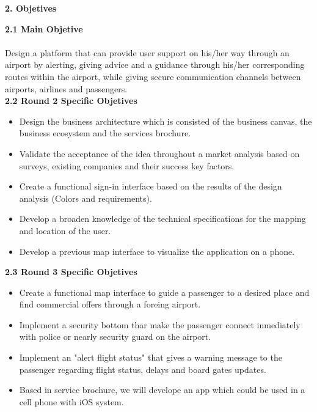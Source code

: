 \documentclass[]{article}
\begin{document}
\Large{\textbf{2. Objetives}\\}

\Large{\textbf{2.1 Main Objetive}\\}\\
[0.1cm]

Design a platform that can provide user support on his/her way through an airport by alerting, giving advice and a guidance through his/her corresponding routes within the airport, while giving secure communication channels between airports, airlines and passengers.\\
[0.7cm]

\Large{\textbf{2.2 Round 2 Specific Objetives}\\}
\begin{itemize}
	\item Design the business architecture which is consisted of the business canvas, the business ecosystem and the services brochure.
	\item Validate the acceptance of the idea throughout a market analysis based on surveys, existing companies and their success key factors.
	\item Create a functional sign-in interface based on the results of the design analysis (Colors and requirements). 
	\item Develop a broaden knowledge of the technical specifications for the mapping and location of the user.
	\item Develop a previous map interface to visualize the application on a phone.\\
[0.7cm]
\end{itemize}

\Large{\textbf{2.3 Round 3 Specific Objetives}\\}
\begin{itemize}
	\item Create a functional map interface to guide a passenger to a desired place and find commercial offers through a foreing airport.
	\item Implement a security bottom thar make the passenger connect inmediately with police or nearly security guard on the airport.
	\item Implement an "alert flight status" that gives a warning message to the passenger regarding flight status, delays and board gates updates. 
	\item Based in service brochure, we will develope an app which could be used in a cell phone with iOS system.\\
[0.6cm]
\end{itemize}
\end{document}
